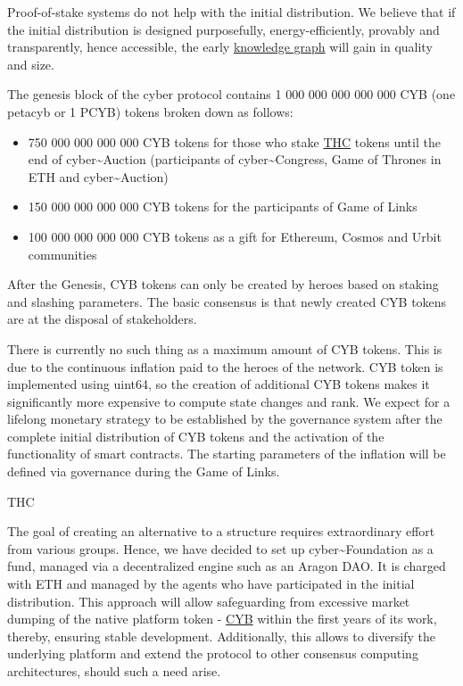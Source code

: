 \documentclass[8pt,oneside]{amsart}
\makeatletter
\newcommand{\linkred}[2]{\href{#1}{\color{red}{#2}}}
\renewcommand\subsection{\@startsection{subsection}
                                    {2}{\z@}
                                    {-3.25ex\@plus -1ex \@minus -.2ex}
                                    {0ex \@plus .2ex}
                                    {\play\Large}
                        }
\newcommand{\titleSection}[1]{\subsection{#1}}
\newenvironment{Figure}
  {\par\medskip\noindent\minipage{\linewidth}}
  {\endminipage\par\medskip}
\makeatother
\begin{document}
Proof-of-stake systems do not help with the initial distribution. We believe that if the initial distribution is designed purposefully, energy-efficiently, provably and transparently, hence accessible, the early {\hyperref[knowledge-graph]{knowledge graph}} will gain in quality and size.

The genesis block of the cyber protocol contains 1 000 000 000 000 000 CYB (one petacyb or 1 PCYB) tokens broken down as follows:

\begin{itemize}
\item 750 000 000 000 000 CYB tokens for those who stake {\hyperref[thc]{THC}} tokens until the end of cyber\~{}Auction (participants of cyber\~{}Congress, Game of Thrones in ETH and cyber\~{}Auction)
\item 150 000 000 000 000 CYB tokens for the participants of Game of Links
\item 100 000 000 000 000 CYB tokens as a gift for Ethereum, Cosmos and Urbit communities
\end{itemize}

\begin{Figure}
 \centering
 
\end{Figure}

After the Genesis, CYB tokens can only be created by heroes based on staking and slashing parameters. The basic consensus is that newly created CYB tokens are at the disposal of stakeholders.

There is currently no such thing as a maximum amount of CYB tokens. This is due to the continuous inflation paid to the heroes of the network. CYB token is implemented using uint64, so the creation of additional CYB tokens makes it significantly more expensive to compute state changes and rank. We expect for a lifelong monetary strategy to be established by the governance system after the complete initial distribution of CYB tokens and the activation of the functionality of smart contracts. The starting parameters of the inflation will be defined via governance during the Game of Links.

\titleSection{THC}\label{thc}

The goal of creating an alternative to a \linkred{https://google.com}{Google-like} structure requires extraordinary effort from various groups. Hence, we have decided to set up cyber\~{}Foundation as a fund, managed via a decentralized engine such as an Aragon DAO. It is charged with ETH and managed by the agents who have participated in the initial distribution. This approach will allow safeguarding from excessive market dumping of the native platform token - {\hyperref[cyb]{CYB}} within the first years of its work, thereby, ensuring stable development. Additionally, this allows to diversify the underlying platform and extend the protocol to other consensus computing architectures, should such a need arise.
\end{document}
